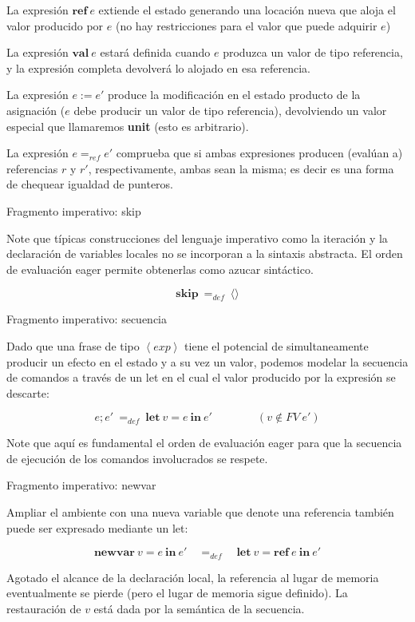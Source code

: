\documentclass{beamer}
\newcommand{\ine}{\ \mathbf{in}\ }
\newcommand{\newvar}{\mathbf{newvar}\ }
\newcommand{\ex}{\left\langle exp\right\rangle}
\begin{document}
\begin{frame}
  La expresión $\textbf{ref}\ e$ extiende el estado generando una
  locación nueva que aloja el valor producido por $e$ (no hay
  restricciones para el valor que puede adquirir $e$)
  \pause
  \bigskip

  La expresión $\textbf{val}\ e$ estará definida cuando $e$ produzca
  un valor de tipo referencia, y la expresión completa devolverá lo
  alojado en esa referencia.
  \pause
  \bigskip
 
  La expresión $e:=e'$ produce la modificación en el estado producto
  de la asignación ($e$ debe producir un valor de tipo referencia),
  devolviendo un valor especial que llamaremos \textbf{unit} (esto es
  arbitrario).
  \pause
  \bigskip
 
  La expresión $e=_{ref} e'$ comprueba que si ambas expresiones
  producen (evalúan a) referencias $r$ y $r'$, respectivamente, ambas
  sean la misma; es decir es una forma de chequear igualdad de
  punteros.
\end{frame}


\begin{frame}{Fragmento imperativo: skip}

  Note que típicas construcciones del lenguaje imperativo como la
  iteración y la declaración de variables locales no se incorporan a
  la sintaxis abstracta. El orden de evaluación eager permite
  obtenerlas como azucar sintáctico.

  \pause

  \[
    \textbf{skip}\ =_{def}\ \langle\rangle
  \]

\end{frame}

\begin{frame}{Fragmento imperativo: secuencia}

  Dado que una frase de tipo $\ex$ tiene el potencial de
  simultaneamente producir un efecto en el estado y a su vez un valor,
  podemos modelar la secuencia de comandos a través de un let en el
  cual el valor producido por la expresión se descarte:

  \[
    e;e'\ =_{def}\ \textbf{let}\ v=e \ine e'\qquad\qquad(v\notin FV\ e')
  \]
  \pause

  Note que aquí es fundamental el orden de evaluación eager para que
  la secuencia de ejecución de los comandos involucrados se respete.

\end{frame}


\begin{frame}{Fragmento imperativo: newvar}

  Ampliar el ambiente con una nueva variable que denote una referencia
  también puede ser expresado mediante un let:

  \[
    \newvar v=e\ine e'\quad =_{def}\quad \textbf{let}\ v=\textbf{ref}\ e \ine e'
  \]

  \pause Agotado el alcance de la declaración local, la referencia al
  lugar de memoria eventualmente se pierde (pero el lugar de memoria
  sigue definido). La restauración de $v$ está dada por la semántica
  de la secuencia.
  

\end{frame}
\end{document}
